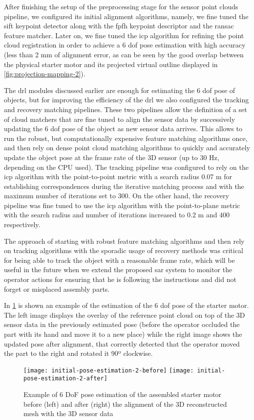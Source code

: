 After finishing the setup of the preprocessing stage for the sensor point clouds pipeline, we configured its initial alignment algorithms, namely, we fine tuned the \gls{sift} keypoint detector along with the \gls{fpfh} keypoint descriptor and the \gls{ransac} feature matcher. Later on, we fine tuned the \gls{icp} algorithm for refining the point cloud registration in order to achieve a 6 \gls{dof} pose estimation with high accuracy (less than 2 mm of alignment error, as can be seen by the good overlap between the physical starter motor and its projected virtual outline displayed in \cref{fig:projection-mapping-2}).

The drl modules discussed earlier are enough for estimating the 6 \gls{dof} pose of objects, but for improving the efficiency of the drl we also configured the tracking and recovery matching pipelines. These two pipelines allow the definition of a set of cloud matchers that are fine tuned to align the sensor data by successively updating the 6 \gls{dof} pose of the object as new sensor data arrives. This allows to run the robust, but computationally expensive feature matching algorithms once, and then rely on dense point cloud matching algorithms to quickly and accurately update the object pose at the frame rate of the 3D sensor (up to 30 Hz, depending on the CPU used). The tracking pipeline was configured to rely on the \gls{icp} algorithm with the point-to-point metric with a search radius 0.07 m for establishing correspondences during the iterative matching process and with the maximum number of iterations set to 300. On the other hand, the recovery pipeline was fine tuned to use the \gls{icp} algorithm with the point-to-plane metric with the search radius and number of iterations increased to 0.2 m and 400 respectively.

The approach of starting with robust feature matching algorithms and then rely on tracking algorithms with the sporadic usage of recovery methods was critical for being able to track the object with a reasonable frame rate, which will be useful in the future when we extend the proposed \gls{sar} system to monitor the operator actions for ensuring that he is following the instructions and did not forget or misplaced assembly parts.

In \cref{fig:initial-pose-estimation} is shown an example of the estimation of the 6 \gls{dof} pose of the starter motor. The left image displays the overlay of the reference point cloud on top of the 3D sensor data in the previously estimated pose (before the operator occluded the part with its hand and move it to a new place) while the right image shows the updated pose after alignment, that correctly detected that the operator moved the part to the right and rotated it 90º clockwise.

\begin{figure}[!ht]
	\centering
	\texttt{[image: initial-pose-estimation-2-before]}
	\texttt{[image: initial-pose-estimation-2-after]}
	\caption{Example of 6 DoF pose estimation of the assembled starter motor before (left) and after (right) the alignment of the 3D reconstructed mesh with the 3D sensor data}
	\label{fig:initial-pose-estimation}
\end{figure}

